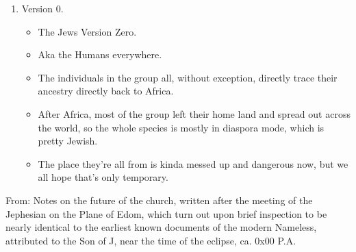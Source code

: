 {\begin{enumerate}
\begin{itemize}
\item The Fish People.
\item Started by Josh.
\item They're like Windows XP, for obvious reasons.
\item At least 100 times larger than Version 1 of the Jews.
\item Their logo is often said to be a lowercase t.
\end{itemize}
\item Version 0.
\begin{itemize}
\item The Jews Version Zero.
\item Aka the Humans everywhere.
\item The individuals in the group all, without exception, directly trace their ancestry directly back to Africa.
\item After Africa, most of the group left their home land and spread out across the world, so the whole species is mostly in diaspora mode, which is pretty Jewish.
\item The place they're all from is kinda messed up and dangerous now, but we all hope that's only temporary.
\end{itemize}
\end{enumerate}
}

\Sentence
{ \hX{} }
{ \eX{} }
{
From: Notes on the future of the church, written after the meeting of the Jephesian on the Plane of Edom, which turn out upon brief inspection to be nearly identical to the earliest known documents of the modern Nameless, attributed to the Son of J, near the time of the eclipse, ca. 0x00 P.A.
}
